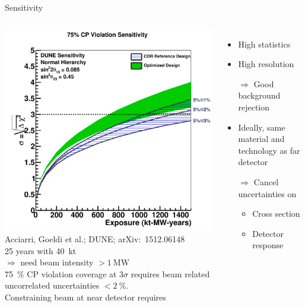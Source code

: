 \documentclass[]{beamer}
\newcommand*{\emphcol}{blue}
\newcommand*{\dune}{{DUNE}}
\begin{document}
\begin{frame}{Sensitivity}
	\begin{columns}[c]
		\centering
		\includegraphics[width=\textwidth]{dune/cpv75_exp_syst}\\
		{\tiny Acciarri, Goeldi et al.; \dune{}; arXiv:~1512.06148~\cite{dune2}}\\
		\num{25} years with \SI{40}{\kilo\tonne}\\
		{\color{\emphcol} $\Rightarrow$ need beam intensity $> \SI{1}{\mega\watt}$}\\
		\SI{75}{\percent} CP violation coverage at $\num{3}\sigma$ requires beam related uncorrelated uncertainties $< \SI{2}{\percent}$.\\
		{\color{\emphcol} Constraining beam at near detector} requires
		\begin{itemize}
			\item High statistics
			\item High resolution
			\item[$\Rightarrow$] Good background rejection
			\item Ideally, same material and technology as far detector
			\item[$\Rightarrow$] Cancel uncertainties on
			\begin{itemize}
				\item Cross section
				\item Detector response
			\end{itemize}
		\end{itemize}
	\end{columns}
\end{frame}
\end{document}
